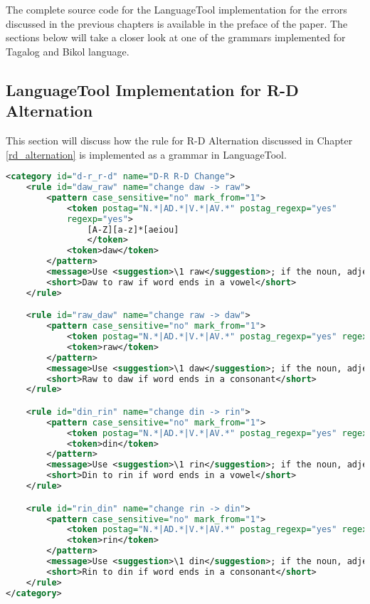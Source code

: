 The complete source code for the LanguageTool implementation for the errors discussed in the previous chapters is available in the preface of the paper. The sections below will take a closer look at one of the grammars implemented for Tagalog and Bikol language.


\subsection{LanguageTool Implementation for R-D Alternation}

This section will discuss how the rule for R-D Alternation discussed in Chapter \ref{rd_alternation} is implemented as a grammar in LanguageTool.

\begin{lstlisting}[language= XML, caption=Grammar for R-D Alternation]
<category id="d-r_r-d" name="D-R R-D Change">
    <rule id="daw_raw" name="change daw -> raw">
        <pattern case_sensitive="no" mark_from="1">
            <token postag="N.*|AD.*|V.*|AV.*" postag_regexp="yes" 
            regexp="yes">
                [A-Z][a-z]*[aeiou]
                </token>
            <token>daw</token>
        </pattern>
        <message>Use <suggestion>\1 raw</suggestion>; if the noun, adjective, verb, or adverb ends in a vowel, you have to use "raw".</message>
        <short>Daw to raw if word ends in a vowel</short>
    </rule>

    <rule id="raw_daw" name="change raw -> daw">
        <pattern case_sensitive="no" mark_from="1">
            <token postag="N.*|AD.*|V.*|AV.*" postag_regexp="yes" regexp="yes">[A-Z][a-z]*[^aeiou]</token>
            <token>raw</token>
        </pattern>
        <message>Use <suggestion>\1 daw</suggestion>; if the noun, adjective, verb, or adverb ends in a consonant, you have to use "daw".</message>
        <short>Raw to daw if word ends in a consonant</short>
    </rule>

    <rule id="din_rin" name="change din -> rin">
        <pattern case_sensitive="no" mark_from="1">
            <token postag="N.*|AD.*|V.*|AV.*" postag_regexp="yes" regexp="yes">[A-Z][a-z]*[aeiou]</token>
            <token>din</token>
        </pattern>
        <message>Use <suggestion>\1 rin</suggestion>; if the noun, adjective, verb, or adverb ends in a vowel, you have to use "rin".</message>
        <short>Din to rin if word ends in a vowel</short>
    </rule>

    <rule id="rin_din" name="change rin -> din">
        <pattern case_sensitive="no" mark_from="1">
            <token postag="N.*|AD.*|V.*|AV.*" postag_regexp="yes" regexp="yes">[A-Z][a-z]*[^aeiou]</token>
            <token>rin</token>
        </pattern>
        <message>Use <suggestion>\1 din</suggestion>; if the noun, adjective, verb, or adverb ends in a consonant, you have to use "din".</message>
        <short>Rin to din if word ends in a consonant</short>
    </rule>
</category>
\end{lstlisting}

